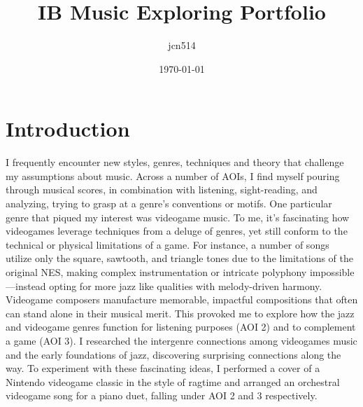 \documentclass[12pt]{article}
\author{jcn514}
\title{IB Music Exploring Portfolio}
\date{\today}
\begin{document}
\maketitle
\tableofcontents

\pagebreak

\section{Introduction}
I frequently encounter new styles, genres, techniques and theory that challenge my assumptions about music. Across a number of AOIs, I find myself pouring through musical scores, in combination with listening, sight-reading, and analyzing, trying to grasp at a genre’s conventions or motifs. One particular genre that piqued my interest was videogame music. To me, it’s fascinating how videogames leverage techniques from a deluge of genres, yet still conform to the technical or physical limitations of a game. For instance, a number of songs utilize only the square, sawtooth, and triangle tones due to the limitations of the original NES, making complex instrumentation or intricate polyphony impossible—instead opting for more jazz like qualities with melody-driven harmony.\autocite{collins_2007} Videogame composers manufacture memorable, impactful compositions that often can stand alone in their musical merit. This provoked me to explore how the jazz and videogame genres function for listening purposes (AOI 2) and to complement a game (AOI 3). I researched the intergenre connections among videogames music and the early foundations of jazz, discovering surprising connections along the way. To experiment with these fascinating ideas, I performed a cover of a Nintendo videogame classic in the style of ragtime and arranged an orchestral videogame song for a piano duet, falling under AOI 2 and 3 respectively.
\end{document}
